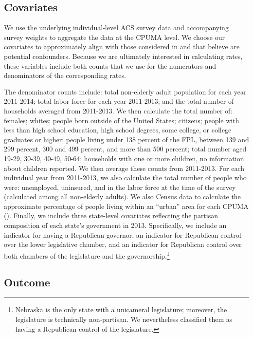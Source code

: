 \documentclass[12pt]{article}
\begin{document}
\subsection{Covariates}

We use the underlying individual-level ACS survey data and accompanying survey weights to aggregate the data at the CPUMA level. We choose our covariates to approximately align with those considered in \cite{courtemanche2017early} and that believe are potential confounders. Because we are ultimately interested in calculating rates, these variables include both counts that we use for the numerators and denominators of the corresponding rates. 

The denominator counts include: total non-elderly adult population for each year 2011-2014; total labor force for each year 2011-2013; and the total number of households averaged from 2011-2013. We then calculate the total number of: females; whites; people born outside of the United States; citizens; people with less than high school education, high school degrees, some college, or college graduates or higher; people living under 138 percent of the FPL, between 139 and 299 percent, 300 and 499 percent, and more than 500 percent; total number aged 19-29, 30-39, 40-49, 50-64; households with one or more children, no information about children reported. We then average these counts from 2011-2013. For each individual year from 2011-2013, we also calculate the total number of people who were: unemployed, uninsured, and in the labor force at the time of the survey (calculated among all non-elderly adults). We also Census data to calculate the approximate percentage of people living within an ``urban'' area for each CPUMA (\cite{census}). Finally, we include three state-level covariates reflecting the partisan composition of each state's government in 2013. Specifically, we include an indicator for having a Republican governor, an indicator for Republican control over the lower legislative chamber, and an indicator for Republican control over both chambers of the legislature and the governorship.\footnote{Nebraska is the only state with a unicameral legislature; moreover, the legislature is technically non-partisan. We nevertheless classified them as having a Republican control of the legislature.} 

\subsection{Outcome}
\end{document}
